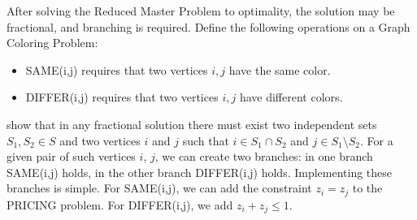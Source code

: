 \documentclass[a4paper]{article}
\begin{document}
After solving the Reduced Master Problem to optimality, the solution may be fractional, and branching is required. Define the following operations on a Graph Coloring Problem:
\begin{itemize}
 \item SAME(i,j) requires that two vertices $i,j$ have the same color.
 \item DIFFER(i,j) requires that two vertices $i,j$ have different colors.
\end{itemize}
\citet{METR95} show that in any fractional solution there must exist two independent sets $S_1,S_2 \in S$ and two vertices $i$ and $j$ such that $i\in S_1 \cap S_2$ and $j\in S_1 \setminus S_2$. For a given pair of such vertices $i$, $j$, we can create two branches: in one branch SAME(i,j) holds, in the other branch DIFFER(i,j) holds. Implementing these branches is simple. For SAME(i,j), we can add the constraint $z_i=z_j$ to the PRICING problem. For DIFFER(i,j), we add $z_i+z_j\leq 1$. 
\end{document}
